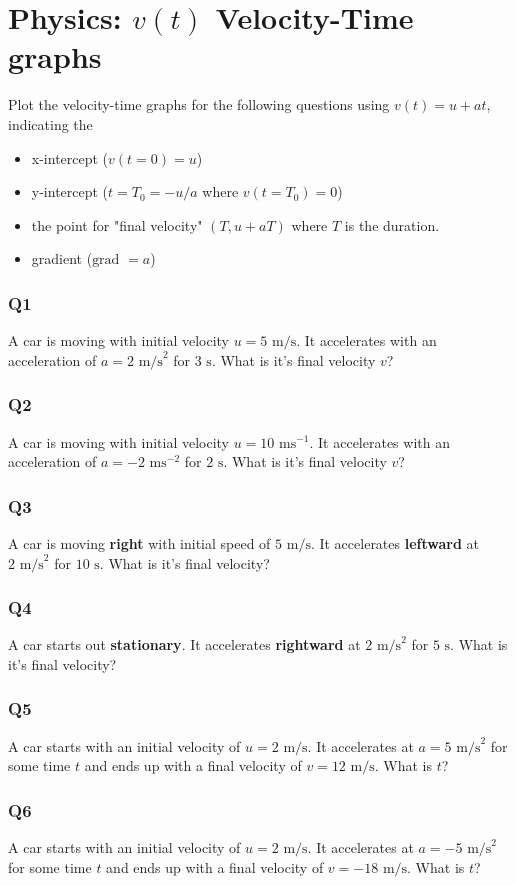 \documentclass{article}
\begin{document}
\section{Physics: $v(t)$ Velocity-Time graphs}
Plot the velocity-time graphs for the following questions using $v(t)=u+at$, indicating the 
\begin{itemize}
    \item x-intercept ($v(t=0) = u$)
    \item y-intercept ($t=T_0=-u/a$ where $v(t=T_0) = 0$)
    \item the point for "final velocity" $(T,u+aT)$ where $T$ is the duration.
    \item gradient ($\text{grad }=a$)
\end{itemize}
\subsubsection{Q1}
A car is moving with initial velocity $u=5 \text{ m/s}$. It accelerates with an acceleration of $a = 2\text{ m/s}^2$ for $3\text{ s}$. What is it's final velocity $v$?
\subsubsection{Q2}
A car is moving with initial velocity $u=10 \text{ ms}^{-1}$. It accelerates with an acceleration of $a = -2\text{ ms}^{-2}$ for $2\text{ s}$. What is it's final velocity $v$?
\subsubsection{Q3}
A car is moving \textbf{right} with initial speed of $5 \text{ m/s}$. It accelerates \textbf{leftward} at $2\text{ m/s}^2$ for $10\text{ s}$. What is it's final velocity?
\subsubsection{Q4}
A car starts out \textbf{stationary}. It accelerates \textbf{rightward} at $2\text{ m/s}^2$ for $5\text{ s}$. What is it's final velocity?
\subsubsection{Q5}
A car starts with an initial velocity of $u=2 \text{ m/s}$. It accelerates at $a=5\text{ m/s}^2$ for some time $t$ and ends up with a final velocity of $v=12 \text{ m/s}$. What is $t$?
\subsubsection{Q6}
A car starts with an initial velocity of $u=2 \text{ m/s}$. It accelerates at $a=-5\text{ m/s}^2$ for some time $t$ and ends up with a final velocity of $v=-18 \text{ m/s}$. What is $t$?
\end{document}

